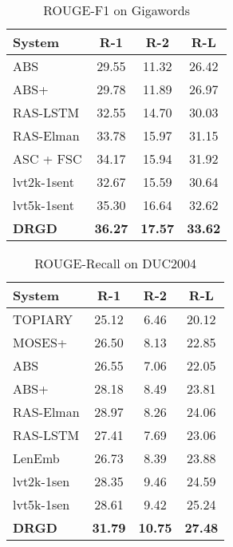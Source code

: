 \documentclass[11pt,letterpaper]{article}
\begin{document}
\begin{table}[!t]
	\centering
	\caption{ROUGE-F1 on Gigawords}
	\label{tab:rouge-agiga}
	\begin{tabular}{p{2.6cm} c c c}
		\hline
		\textbf{System}  & \textbf{R-1} & \textbf{R-2} & \textbf{R-L}  \\
		\hline
		ABS       & 29.55 & 11.32 & 26.42  \\
		ABS+       & 29.78 & 11.89 & 26.97  \\
		RAS-LSTM       & 32.55 & 14.70 & 30.03  \\
		RAS-Elman       & 33.78 & 15.97 & 31.15  \\
		ASC + FSC       & 34.17 & 15.94 & 31.92  \\
lvt2k-1sent     & 32.67 & 15.59 & 30.64  \\
		lvt5k-1sent     & 35.30 & 16.64 & 32.62  \\
\textbf{DRGD}       & \textbf{36.27} & \textbf{17.57} & \textbf{33.62}  \\
		\hline
	\end{tabular}
\end{table}


\begin{table}[!t]
	\centering
	\caption{ROUGE-Recall on DUC2004}
	\label{tab:rouge-duc04}
	\begin{tabular}{p{2.6cm} c c c}
		\hline
		\textbf{System}  & \textbf{R-1} & \textbf{R-2} & \textbf{R-L} \\
		\hline
		TOPIARY & 25.12 & 6.46 & 20.12  \\
		MOSES+ & 26.50 & 8.13 & 22.85  \\
		ABS       & 26.55 &	7.06 &	22.05  \\
		ABS+       & 28.18 & 8.49 & 23.81  \\
		RAS-Elman       & 28.97 & 8.26 & 24.06  \\
		RAS-LSTM       & 27.41 & 7.69 & 23.06  \\
		LenEmb       & 26.73 & 8.39 & 23.88  \\
		lvt2k-1sen       & 28.35 & 9.46 & 24.59  \\
		lvt5k-1sen & 28.61 & 9.42 & 25.24  \\
		\textbf{DRGD}       & \textbf{31.79} & \textbf{10.75} & \textbf{27.48} \\
		\hline
	\end{tabular}
\end{table}
\end{document}
